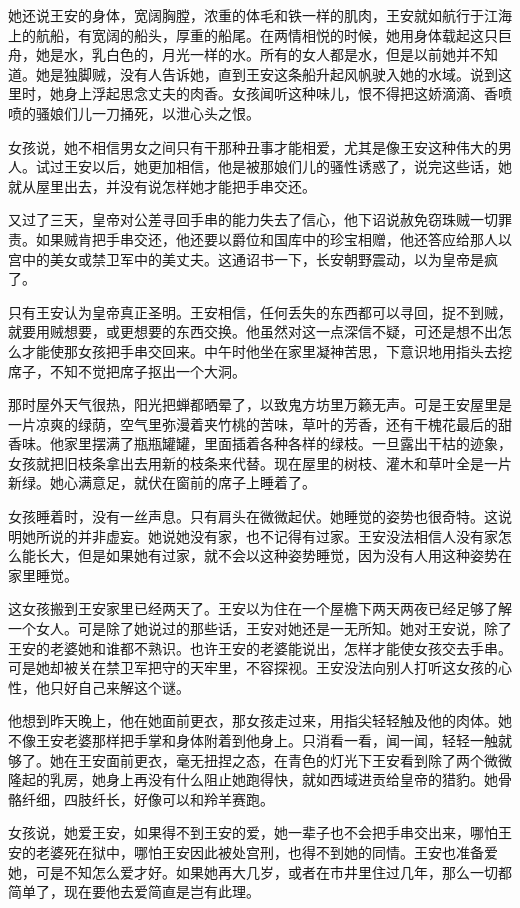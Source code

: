她还说王安的身体，宽阔胸膛，浓重的体毛和铁一样的肌肉，王安就如航行于江海上的航船，有宽阔的船头，厚重的船尾。在两情相悦的时候，她用身体载起这只巨舟，她是水，乳白色的，月光一样的水。所有的女人都是水，但是以前她并不知道。她是独脚贼，没有人告诉她，直到王安这条船升起风帆驶入她的水域。说到这里时，她身上浮起思念丈夫的肉香。女孩闻听这种味儿，恨不得把这娇滴滴、香喷喷的骚娘们儿一刀捅死，以泄心头之恨。 

女孩说，她不相信男女之间只有干那种丑事才能相爱，尤其是像王安这种伟大的男人。试过王安以后，她更加相信，他是被那娘们儿的骚性诱惑了，说完这些话，她就从屋里出去，并没有说怎样她才能把手串交还。 

又过了三天，皇帝对公差寻回手串的能力失去了信心，他下诏说赦免窃珠贼一切罪责。如果贼肯把手串交还，他还要以爵位和国库中的珍宝相赠，他还答应给那人以宫中的美女或禁卫军中的美丈夫。这通诏书一下，长安朝野震动，以为皇帝是疯了。 

只有王安认为皇帝真正圣明。王安相信，任何丢失的东西都可以寻回，捉不到贼，就要用贼想要，或更想要的东西交换。他虽然对这一点深信不疑，可还是想不出怎么才能使那女孩把手串交回来。中午时他坐在家里凝神苦思，下意识地用指头去挖席子，不知不觉把席子抠出一个大洞。 

那时屋外天气很热，阳光把蝉都晒晕了，以致鬼方坊里万籁无声。可是王安屋里是一片凉爽的绿荫，空气里弥漫着夹竹桃的苦味，草叶的芳香，还有干槐花最后的甜香味。他家里摆满了瓶瓶罐罐，里面插着各种各样的绿枝。一旦露出干枯的迹象，女孩就把旧枝条拿出去用新的枝条来代替。现在屋里的树枝、灌木和草叶全是一片新绿。她心满意足，就伏在窗前的席子上睡着了。 

女孩睡着时，没有一丝声息。只有肩头在微微起伏。她睡觉的姿势也很奇特。这说明她所说的并非虚妄。她说她没有家，也不记得有过家。王安没法相信人没有家怎么能长大，但是如果她有过家，就不会以这种姿势睡觉，因为没有人用这种姿势在家里睡觉。 

这女孩搬到王安家里已经两天了。王安以为住在一个屋檐下两天两夜已经足够了解一个女人。可是除了她说过的那些话，王安对她还是一无所知。她对王安说，除了王安的老婆她和谁都不熟识。也许王安的老婆能说出，怎样才能使女孩交去手串。可是她却被关在禁卫军把守的天牢里，不容探视。王安没法向别人打听这女孩的心性，他只好自己来解这个谜。 

他想到昨天晚上，他在她面前更衣，那女孩走过来，用指尖轻轻触及他的肉体。她不像王安老婆那样把手掌和身体附着到他身上。只消看一看，闻一闻，轻轻一触就够了。她在王安面前更衣，毫无扭捏之态，在青色的灯光下王安看到除了两个微微隆起的乳房，她身上再没有什么阻止她跑得快，就如西域进贡给皇帝的猎豹。她骨骼纤细，四肢纤长，好像可以和羚羊赛跑。 

女孩说，她爱王安，如果得不到王安的爱，她一辈子也不会把手串交出来，哪怕王安的老婆死在狱中，哪怕王安因此被处宫刑，也得不到她的同情。王安也准备爱她，可是不知怎么爱才好。如果她再大几岁，或者在市井里住过几年，那么一切都简单了，现在要他去爱简直是岂有此理。 

